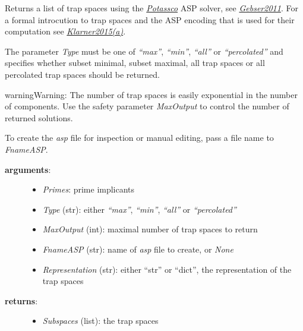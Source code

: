 \documentclass[letterpaper,10pt,english]{sphinxmanual}
\begin{document}
\begin{fulllineitems}
\label{AspSolver:PyBoolNet.AspSolver.trap_spaces}
Returns a list of trap spaces using the {\hyperref[Installation:installation-potassco]{\emph{Potassco}}} ASP solver, see {\hyperref[Bibliography:gebser2011]{\emph{Gebser2011}}}.
For a formal introcution to trap spaces and the ASP encoding that is used for their computation see {\hyperref[Bibliography:klarner2015trap]{\emph{Klarner2015(a)}}}.

The parameter \emph{Type} must be one of \emph{``max''}, \emph{``min''}, \emph{``all''} or \emph{``percolated''} and
specifies whether subset minimal, subset maximal, all trap spaces or all percolated trap spaces should be returned.

\begin{notice}{warning}{Warning:}
The number of trap spaces is easily exponential in the number of components.
Use the safety parameter \emph{MaxOutput} to control the number of returned solutions.
\end{notice}

To create the \emph{asp} file for inspection or manual editing, pass a file name to \emph{FnameASP}.
\begin{description}
\item[{\textbf{arguments}:}] \leavevmode\begin{itemize}
\item {} 
\emph{Primes}: prime implicants

\item {} 
\emph{Type} (str): either \emph{``max''}, \emph{``min''}, \emph{``all''} or \emph{``percolated''}

\item {} 
\emph{MaxOutput} (int): maximal number of trap spaces to return

\item {} 
\emph{FnameASP} (str): name of \emph{asp} file to create, or \emph{None}

\item {} 
\emph{Representation} (str): either ``str'' or ``dict'', the representation of the trap spaces

\end{itemize}

\item[{\textbf{returns}:}] \leavevmode\begin{itemize}
\item {} 
\emph{Subspaces} (list): the trap spaces


\end{itemize}
\end{description}
\end{fulllineitems}
\end{document}
